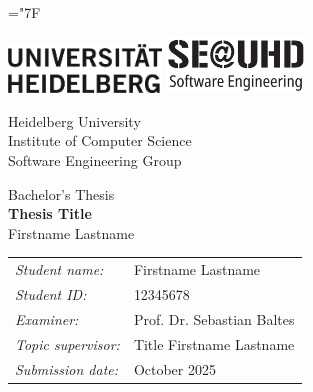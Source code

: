 \documentclass[
    pdftex,
    final,
    11pt,
    a4paper,
    parskip=false, %
    twoside, %
    footheight=0mm, %
    footinclude=false,
    toc=bibliography, %
    toc=listof %
]{scrbook} %
\newcommand{\thesistype}{Bachelor's Thesis} %
\newcommand{\thesistitle}{Thesis Title}
\newcommand{\studentname}{Firstname Lastname}
\newcommand{\submissiondate}{\nth{1} October 2025}
\newcommand{\studentid}{12345678}
\newcommand{\examiner}{Prof. Dr. Sebastian Baltes}
\newcommand{\supervisor}{Title Firstname Lastname} %
\begin{document}
\hyphenchar\font=\string"7F %

\frontmatter %

\begin{titlepage}

	\begin{center}
		\includegraphics[height=1.3cm,valign=t]{figures/logos/logo-uhd.png}	
		\hfill
		\includegraphics[height=1.5cm,valign=t]{figures/logos/se-uhd-logo.png}	
	\end{center}
	
	\vspace{2cm}

    \begin{center}
        \large
        Heidelberg University\\
        Institute of Computer Science\\
        Software Engineering Group
    \end{center}

    \vspace{3cm}
    
	\begin{center}
		{\large \thesistype}\\
		\vspace{1.5\baselineskip}
		{\LARGE\textsf{\textbf{\thesistitle}}}\\
        \vspace{1.5\baselineskip}
        {\large \studentname}
	\end{center}

	\vfill

    \begin{center}
        \large
        \begin{tabular}{@{}ll@{}}
        \emph{Student name:} & \studentname \\
        \emph{Student ID:} & \studentid \\
        \emph{Examiner:} & \examiner \\
        \emph{Topic supervisor:} & \supervisor \\
        \emph{Submission date:} & \submissiondate
        \end{tabular}
    \end{center}

    \vspace{2cm}

\end{titlepage}
\end{document}
